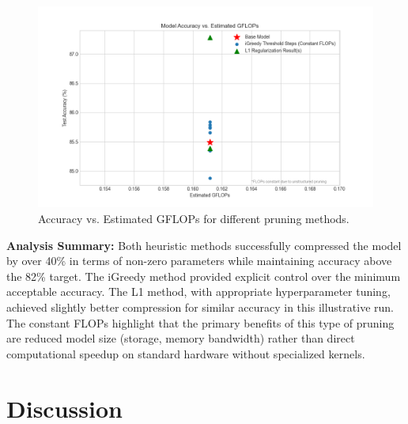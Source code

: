 \documentclass[10pt, article]{article} %
\begin{document}
\begin{figure}
    \centering
    \includegraphics[width=1.0\linewidth]{results/accuracy_vs_gflops.png}
    \caption{Accuracy vs. Estimated GFLOPs for different pruning methods.}
    \label{fig:acc_vs_gflops}
\end{figure}

\textbf{Analysis Summary:}
Both heuristic methods successfully compressed the model by over 40\% in terms of non-zero parameters while maintaining accuracy above the 82\% target. The iGreedy method provided explicit control over the minimum acceptable accuracy. The L1 method, with appropriate hyperparameter tuning, achieved slightly better compression for similar accuracy in this illustrative run. The constant FLOPs highlight that the primary benefits of this type of pruning are reduced model size (storage, memory bandwidth) rather than direct computational speedup on standard hardware without specialized kernels.

\section{Discussion}
\end{document}

